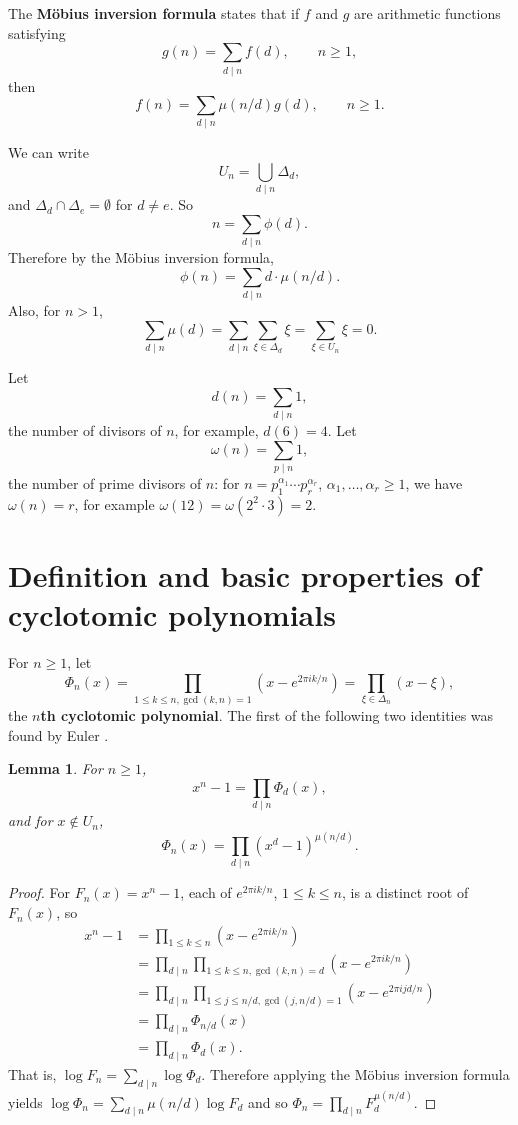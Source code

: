 \documentclass{article}
\newtheorem{lemma}[theorem]{Lemma}
\theoremstyle{definition}
\begin{document}
The \textbf{M\"obius inversion formula} states that if $f$ and $g$ are arithmetic functions satisfying
\[
g(n) = \sum_{d \mid n} f(d),\qquad n \geq 1,
\]
then
\[
f(n) = \sum_{d \mid n} \mu(n/d) g(d), \qquad n \geq 1.
\]

We can write
\[
U_n = \bigcup_{d \mid n} \Delta_d,
\]
and $\Delta_d \cap \Delta_e = \emptyset$ for $d \neq e$. 
So
\[
n = \sum_{d \mid n} \phi(d).
\]
Therefore by the M\"obius inversion formula,
\[
\phi(n) = \sum_{d \mid n} d \cdot \mu(n/d).
\]
Also, for $n > 1$,
\begin{equation}
\sum_{d \mid n} \mu(d) = \sum_{d \mid n} \sum_{\xi \in \Delta_d} \xi = \sum_{\xi \in U_n} \xi = 0.
\label{mobiussum}
\end{equation}

Let
\[
d(n) = \sum_{d \mid n} 1,
\]
the number of divisors of $n$, for example, $d(6) = 4$. Let
\[
\omega(n)=\sum_{p \mid n} 1,
\]
the number of prime divisors of $n$: for $n=p_1^{\alpha_1} \cdots p_r^{\alpha_r}$, $\alpha_1,\ldots,\alpha_r \geq 1$,
we have $\omega(n)=r$, for example
$\omega(12)=\omega(2^2 \cdot 3) = 2$. 








\section{Definition and basic properties of cyclotomic polynomials}
For $n \geq 1$, let
\[
\Phi_n(x) =\prod_{1\le k\le n, \gcd(k,n)=1}
(x-e^{2\pi i k/n})
= \prod_{\xi \in \Delta_n} (x-\xi),
\]
the \textbf{$n$th cyclotomic polynomial}.
The first of the following two identities was found by Euler \cite[pp.~199--200, Chap. III, \S VI]{weil}.

\begin{lemma}
For $n \geq 1$,
\[
x^n-1 = \prod_{d \mid n} \Phi_d(x),
\]
and for $x \not \in U_n$,
\[
\Phi_n(x) = \prod_{d \mid n} (x^d-1)^{\mu(n/d)}.
\]
\label{mobiuslemma}
\end{lemma}
\begin{proof}
For $F_n(x) = x^n-1$, 
each of $e^{2\pi ik/n}$, $1 \leq k \leq n$, is a distinct root of $F_n(x)$, so
\begin{align*}
x^n-1 &= \prod_{1 \leq k \leq n} (x-e^{2\pi ik/n}) \\
&=\prod_{d \mid n} \prod_{1\le k\le n, \gcd(k,n)=d}
(x-e^{2\pi i k/n})\\
&=\prod_{d \mid n}\prod_{1\le j \le n/d, \gcd(j,n/d)=1} (x-e^{2\pi ijd/n})\\
&=\prod_{d \mid n} \Phi_{n/d}(x)\\
&=\prod_{d \mid n} \Phi_d(x).
\end{align*}
That is, $\log F_n = \sum_{d \mid n} \log \Phi_d$. Therefore applying the M\"obius inversion formula yields
$\log \Phi_n = \sum_{d \mid n} \mu(n/d) \log F_d$ and so
$\Phi_n = \prod_{d \mid n} F_{d}^{\mu(n/d)}$.
\end{proof}
\end{document}
